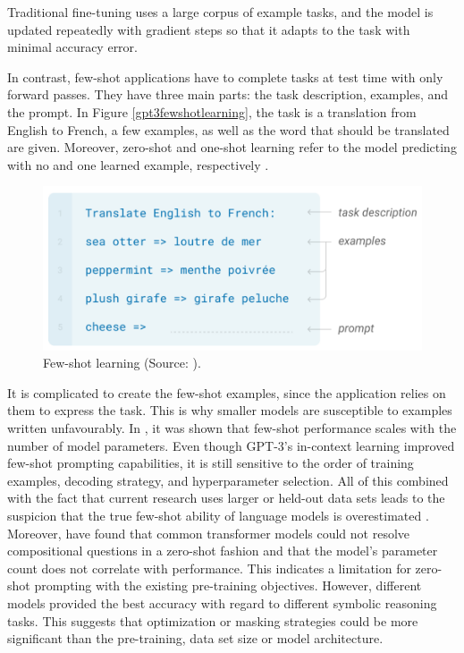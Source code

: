 \documentclass[
]{krantz}
\begin{document}
Traditional fine-tuning uses a large corpus of example tasks, and the
model is updated repeatedly with gradient steps so that it adapts to the
task with minimal accuracy error.

In contrast, few-shot applications have to complete tasks at test time
with only forward passes. They have three main parts: the task
description, examples, and the prompt. In Figure \ref{gpt3fewshotlearning}, the task is a translation
from English to French, a few examples, as well as the word that should
be translated are given. Moreover, zero-shot and one-shot learning refer
to the model predicting with no and one learned example, respectively
\citep{Brown2020}.

\begin{figure}

{\centering \includegraphics[width=0.5\linewidth]{./figures/01-01-nlp/gpt3_few-shot-learning} 

}

\caption{Few-shot learning (Source: \citet{Brown2020}).}\label{fig:gpt3fewshotlearning}
\end{figure}



It is complicated to create the few-shot examples, since the application
relies on them to express the task. This is why smaller models are
susceptible to examples written unfavourably. In \citet{Brown2020}, it was
shown that few-shot performance scales with the number of model
parameters. Even though GPT-3's in-context learning improved few-shot
prompting capabilities, it is still sensitive to the order of training
examples, decoding strategy, and hyperparameter selection. All of this
combined with the fact that current research uses larger or held-out
data sets leads to the suspicion that the true few-shot ability of
language models is overestimated \citep{Perez2021}.\\

Moreover, \citet{Lialin2022} have found that common transformer models could
not resolve compositional questions in a zero-shot fashion and that the
model's parameter count does not correlate with performance. This
indicates a limitation for zero-shot prompting with the existing
pre-training objectives. However, different models provided the best
accuracy with regard to different symbolic reasoning tasks. This
suggests that optimization or masking strategies could be more
significant than the pre-training, data set size or model architecture.
\end{document}
